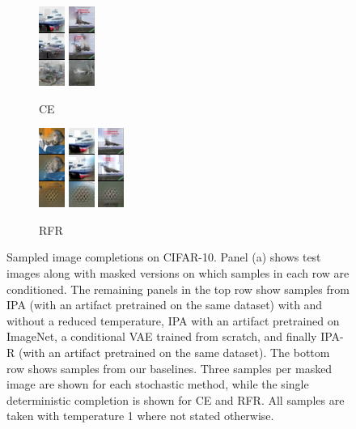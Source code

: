 \begin{figure}[t]
\begin{subfigure}[t]{0.06\textwidth}
      \includegraphics[height=\cifarimgheight]{figs/cigcvae/image-samples/cifar10/freeform_ce_1_samples}
      \includegraphics[height=\cifarimgheight]{figs/cigcvae/image-samples/cifar10/freeform_ce_3_samples}
      \caption*{\scriptsize CE}
    \end{subfigure}
    \begin{subfigure}[t]{0.06\textwidth}
      \centering
      \includegraphics[height=\cifarimgheight]{figs/cigcvae/image-samples/cifar10/freeform_rfr_0_samples}
      \includegraphics[height=\cifarimgheight]{figs/cigcvae/image-samples/cifar10/freeform_rfr_1_samples}
      \includegraphics[height=\cifarimgheight]{figs/cigcvae/image-samples/cifar10/freeform_rfr_3_samples}
      \caption*{\scriptsize RFR}
    \end{subfigure}
    \caption{Sampled image completions on CIFAR-10. Panel (a) shows test images along
      with masked versions on which samples in each row are conditioned. The
      remaining panels in the top row show samples from IPA (with an artifact
      pretrained on the same dataset) with and without a reduced temperature,
      IPA with an artifact pretrained on ImageNet, a conditional VAE trained
      from scratch, and finally IPA-R (with an artifact pretrained on the same
      dataset). The bottom row shows samples from our baselines. Three samples
      per masked image are shown for each stochastic method, while the single
      deterministic completion is shown for CE and RFR. All samples are taken
      with temperature 1 where not stated otherwise.}
    \label{fig:cigcvae-cifar-samples-0}
  \end{figure}


